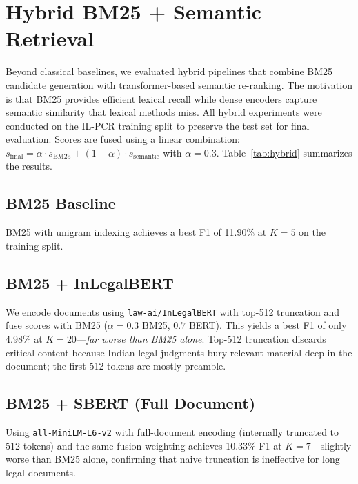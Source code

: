 \documentclass[11pt]{article}
\begin{document}
\section{Hybrid BM25 + Semantic Retrieval}

Beyond classical baselines, we evaluated hybrid pipelines that combine BM25 candidate generation with transformer-based semantic re-ranking.
The motivation is that BM25 provides efficient lexical recall while dense encoders capture semantic similarity that lexical methods miss.
All hybrid experiments were conducted on the IL-PCR training split to preserve the test set for final evaluation.
Scores are fused using a linear combination: $s_{\text{final}} = \alpha \cdot s_{\text{BM25}} + (1-\alpha) \cdot s_{\text{semantic}}$ with $\alpha{=}0.3$.
Table~\ref{tab:hybrid} summarizes the results.

\subsection{BM25 Baseline}
BM25 with unigram indexing achieves a best F1 of 11.90\% at $K{=}5$ on the training split.

\subsection{BM25 + InLegalBERT}
We encode documents using \texttt{law-ai/InLegalBERT} with top-512 truncation and fuse scores with BM25 ($\alpha{=}0.3$ BM25, $0.7$ BERT).
This yields a best F1 of only 4.98\% at $K{=}20$---\emph{far worse than BM25 alone}.
Top-512 truncation discards critical content because Indian legal judgments bury relevant material deep in the document; the first 512 tokens are mostly preamble.

\subsection{BM25 + SBERT (Full Document)}
Using \texttt{all-MiniLM-L6-v2} with full-document encoding (internally truncated to 512 tokens) and the same fusion weighting achieves 10.33\% F1 at $K{=}7$---slightly worse than BM25 alone, confirming that naive truncation is ineffective for long legal documents.
\end{document}

